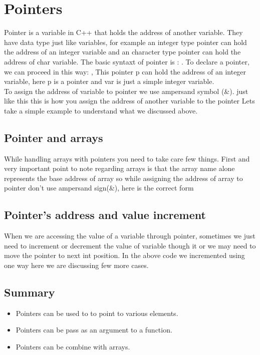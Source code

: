 \documentclass[11pt, a4paper]{article}
\begin{document}
\newpage
\section{Pointers}
Pointer is a variable in C++ that holds the address of another variable.
They have data type just like variables, for example an integer type pointer
can hold the address of an integer variable and an character type pointer can hold
the address of char variable. The basic syntaxt of pointer is :
. To declare a pointer, we can proceed in this way:
, This pointer p can hold the address of an integer
variable, here p is a pointer and var is just a simple integer variable.\\
To assign the address of variable to pointer we use ampersand symbol (\&). just like this
 this is how you assign the address of another variable to the pointer
Lets take a simple example to understand what we discussed above.


\subsection{Pointer and arrays}
While handling arrays with pointers you need to take care few things.
First and very important point to note regarding arrays is that the array name
alone represents the base address of array so while assigning the address of array
to pointer don’t use ampersand sign(\&), here is the correct form 


\subsection{Pointer's address and value increment}
When we are accessing the value of a variable through pointer, sometimes we just
need to increment or decrement the value of variable though it or we may need to move
the pointer to next int position. In the above code we incremented using one way here
we are discussing few more cases.


\subsection{Summary}
\begin{itemize}
    \item Pointers can be used to to point to various elements.
    \item Pointers can be pass as an argument to a function.
    \item Pointers can be combine with arrays.
\end{itemize}
\end{document}
